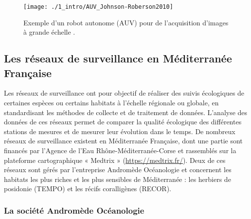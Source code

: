 \begin{figure}[H]
	\begin{center}
	\texttt{[image: ./1\_intro/AUV\_Johnson-Roberson2010]}
		\caption[Exemple d’un robot autonome (AUV) pour de l’acquisition d’images à grande échelle]{Exemple d’un robot autonome (AUV) pour de l’acquisition d’images à grande échelle \citep{johnson-roberson_generation_2010}.}
	\label{figure_intro15}
\end{center}
\end{figure}

\setlength{\fboxsep}{3pt}
\setlength{\fboxrule}{0.6pt}
\noindent{}

\subsection{Les réseaux de surveillance en Méditerranée Française}\label{intro.2.3}

Les réseaux de surveillance ont pour objectif de réaliser des suivis écologiques de certaines espèces ou certains habitats à l’échelle régionale ou globale, en standardisant les méthodes de collecte et de traitement de données. L’analyse des données de ces réseaux permet de comparer la qualité écologique des différentes stations de mesures et de mesurer leur évolution dans le temps. De nombreux réseaux de surveillance existent en Méditerranée Française, dont une partie sont financés par l’Agence de l’Eau Rhône-Méditerranée-Corse et rassemblés sur la plateforme cartographique « Medtrix » (\href{https://medtrix.fr/}{https://medtrix.fr/}). Deux de ces réseaux sont gérés par l’entreprise Andromède Océanologie et concernent les habitats les plus riches et les plus sensibles de Méditerranée : les herbiers de posidonie (TEMPO) et les récifs coralligènes (RECOR).

\subsubsection{La société Andromède Océanologie}\label{intro.2.3.1}

